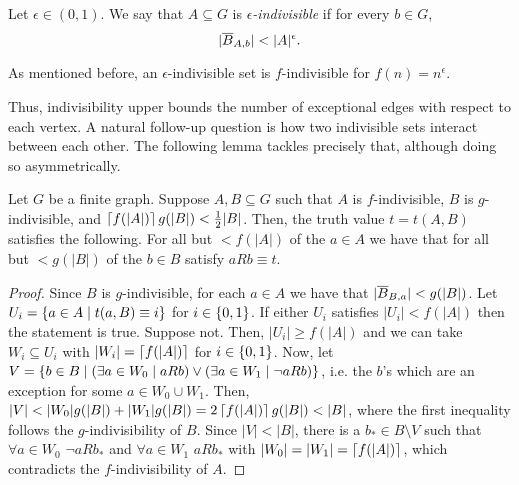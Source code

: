         \begin{definition} \label{def:epsilon_indivisible}
            Let $\epsilon \in (0,1)$.
            We say that $A \subseteq G$ is \emph{$\epsilon$-indivisible} if for every $b \in G$,
            \[
                | \overline{B}_{A,b} | < |A|^{\epsilon}.
            \]
        \end{definition}

        As mentioned before, an $\epsilon$-indivisible set is $f$-indivisible for $f(n) = n^\epsilon$.

        Thus, indivisibility upper bounds the number of exceptional edges with respect to each vertex.
        A natural follow-up question is how two indivisible sets interact between each other.
        The following lemma tackles precisely that, although doing so asymmetrically.

        \begin{lemma}[Claim 4.6)] \label{lem:average_condition_statement}
            Let $G$ be a finite graph.
            Suppose $A, B \subseteq G$ such that $A$ is $f$-indivisible, $B$ is $g$-indivisible, and $\left\lceil f(|A|) \right\rceil g(|B|) < \frac{1}{2} |B|$.
            Then, the truth value $t = t(A,B)$ satisfies the following.
            For all but $< f(|A|)$ of the $a \in A$ we have that for all but $< g(|B|)$ of the $b \in B$ satisfy $a R b \equiv t$.
            \begin{proof}
                Since $B$ is $g$-indivisible, for each $a \in A$ we have that $| \overline{B}_{B,a} | < g(|B|)$.
                Let $U_i = \{ a \in A \mid t(a,B) \equiv i \}$ for $i \in \{ 0,1 \}$.
                If either $U_i$ satisfies $|U_i| < f(|A|)$ then the statement is true.
                Suppose not.
                Then, $|U_i| \geq f(|A|)$ and we can take $W_i \subseteq U_i$ with $|W_i| = \left\lceil f(|A|) \right\rceil$ for $i \in \{ 0,1 \}$.
                Now, let $V = \{ b \in B \mid (\exists a \in W_0 \mid a R b) \vee (\exists a \in W_1 \mid \lnot a R b) \}$,
                i.e. the $b$'s which are an exception for some $a \in W_0 \cup W_1$.
                Then, $|V| < |W_0| g(|B|) + |W_1| g(|B|) = 2 \left\lceil f(|A|) \right\rceil g(|B|) < |B|$, where the first inequality follows the
                $g$-indivisibility of $B$.
                Since $|V| < |B|$, there is a $b_* \in B \setminus V$ such that $\forall a \in W_0$ $\lnot a R b_*$ and
                $\forall a \in W_1$ $a R b_*$ with $|W_0| = |W_1| = \left\lceil f(|A|) \right\rceil$, which contradicts the $f$-indivisibility of $A$.
            \end{proof}
        \end{lemma}

